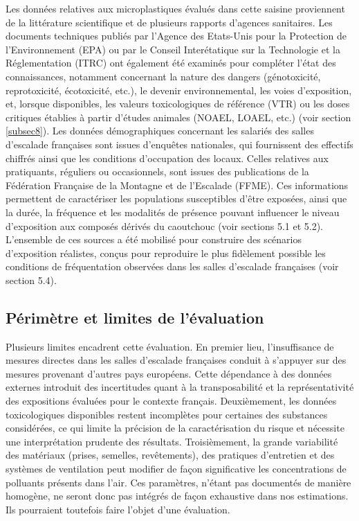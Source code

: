 \documentclass[pdflatex,sn-basic]{sn-jnl}%
\begin{document}
Les données relatives aux microplastiques évalués dans cette saisine proviennent de la littérature scientifique et de plusieurs rapports d'agences sanitaires. Les documents techniques publiés par l'Agence des Etats-Unis pour la Protection de l'Environnement (EPA) ou par le
Conseil Interétatique sur la Technologie et la Réglementation (ITRC) ont également été examinés pour compléter l'état des connaissances, notamment concernant la nature des dangers (génotoxicité, reprotoxicité, écotoxicité, etc.), le devenir environnemental, les voies d'exposition, et, lorsque disponibles, les valeurs toxicologiques de référence (VTR) ou les doses critiques établies à partir d'études animales (NOAEL, LOAEL, etc.) (voir section \ref{subsec8}). Les données démographiques concernant les salariés des salles d'escalade françaises sont issues d'enquêtes nationales, qui fournissent des effectifs chiffrés ainsi que les conditions d'occupation des locaux. Celles relatives aux pratiquants, réguliers ou occasionnels, sont issues des publications de la Fédération Française de la Montagne et de l'Escalade (FFME). Ces informations permettent de caractériser les populations susceptibles d'être exposées, ainsi que la durée, la fréquence et les modalités de présence pouvant influencer le niveau d'exposition aux composés dérivés du caoutchouc (voir sections 5.1 et 5.2). L'ensemble de ces sources a été mobilisé pour construire des scénarios d'exposition réalistes, conçus pour reproduire le plus fidèlement possible les conditions de fréquentation observées dans les salles d'escalade françaises (voir section 5.4).

\subsection{Périmètre et limites de l'évaluation}\label{subsec4}

Plusieurs limites encadrent cette évaluation. En premier lieu, l'insuffisance de mesures directes dans les salles d'escalade françaises conduit à s'appuyer sur des mesures provenant d'autres pays européens. Cette dépendance à des données externes introduit des incertitudes quant à la transposabilité et la représentativité des expositions évaluées pour le contexte français. Deuxièmement, les données toxicologiques disponibles restent incomplètes pour certaines des substances considérées, ce qui limite la précision de la caractérisation du risque et nécessite une interprétation prudente des résultats. Troisièmement, la grande variabilité des matériaux (prises, semelles, revêtements), des pratiques d'entretien et des systèmes de ventilation peut modifier de façon significative les concentrations de polluants présents dans l'air. Ces paramètres, n'étant pas documentés de manière homogène, ne seront donc pas intégrés de façon exhaustive dans nos estimations. Ils pourraient toutefois faire l'objet d'une évaluation.
\end{document}
